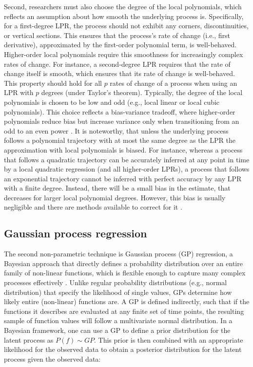 \documentclass[man, floatsintext]{apa7}
\begin{document}
Second, researchers must also choose the degree of the local polynomials, which
reflects an assumption about how smooth the underlying process is.
Specifically, for a first-degree LPR, the process should not exhibit any
corners, discontinuities, or vertical sections. This ensures that the process's
rate of change (i.e., first derivative), approximated by the first-order
polynomial term, is well-behaved. Higher-order local polynomials require this
smoothness for increasingly complex rates of change. For instance, a
second-degree LPR requires that the rate of change itself is smooth, which
ensures that its rate of change is well-behaved. This property should hold for
all $p$ rates of change of a process when using an LPR with $p$ degrees (under
Taylor's theorem). Typically, the degree of the local polynomials is chosen to
be low and odd (e.g., local linear or local cubic polynomials). This choice
reflects a bias-variance tradeoff, where higher-order polynomials reduce bias
but increase variance only when transitioning from an odd to an even power
\parencite{ruppert_multivariate_1994}. It is noteworthy, that unless the
underlying process follows a polynomial trajectory with at most the same degree
as the LPR the approximation with local polynomials is biased. For instance,
whereas a process that follows a quadratic trajectory can be accurately
inferred at any point in time by a local quadratic regression (and all
higher-order LPRs), a process that follows an exponential trajectory cannot be
inferred with perfect accuracy by any LPR with a finite degree. Instead, there
will be a small bias in the estimate, that decreases for larger local
polynomial degrees. However, this bias is usually negligible and there are
methods available to correct for it \parencite{R-nprobust}.

\subsection{Gaussian process regression}

The second non-parametric technique is Gaussian process (GP) regression, a
Bayesian approach that directly defines a probability distribution over an
entire family of non-linear functions, which is flexible enough to capture many
complex processes effectively \parencite{rasmussen_gaussian_2006,
  betancourt_robust_2020, roberts_gaussian_2013}. Unlike regular probability
distributions (e.g., normal distribution) that specify the likelihood of
single values, GPs determine how likely entire
(non-linear) functions are. A GP is defined indirectly, such that if the
functions it describes are evaluated at any finite set of time points, the
resulting sample of function values will follow a multivariate normal
distribution. In a Bayesian framework, one can use a GP to define a prior
distribution for the latent process as $P(f) \sim GP$. This prior is then
combined with an appropriate likelihood for the observed data to obtain a
posterior distribution for the latent process given the observed data:
\end{document}
